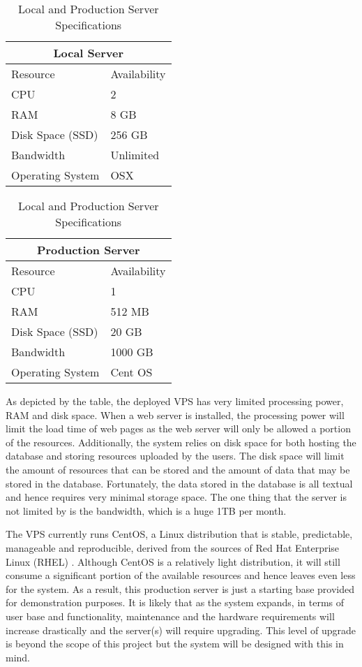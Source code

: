 \begin{table}[H]
	\centering
	\begin{tabular}{@{}ll@{}}
		\toprule
		\multicolumn{2}{c}{Local Server}       	\\ \midrule
		Resource         & Availability 			\\ \midrule
		CPU              & 2            			\\
		RAM              & 8 GB       			\\
		Disk Space (SSD) & 256 GB        		\\
		Bandwidth        & Unlimited      		\\
		Operating System & OSX     				\\ \bottomrule
	\end{tabular}
	\quad
	\begin{tabular}{@{}ll@{}}
		\toprule
		\multicolumn{2}{c}{Production Server}	\\ \midrule
		Resource         & Availability 			\\ \midrule
		CPU              & 1            			\\
		RAM              & 512 MB       			\\
		Disk Space (SSD) & 20 GB        			\\
		Bandwidth        & 1000 GB      			\\
		Operating System & Cent OS      			\\ \bottomrule
	\end{tabular}
	\caption{Local and Production Server Specifications}
	\label{table:ServerSpec}
\end{table}

As depicted by the table, the deployed VPS has very limited processing power, RAM and disk space. When a web server is installed, the processing power will limit the load time of web pages as the web server will only be allowed a portion of the resources. Additionally, the system relies on disk space for both hosting the database and storing resources uploaded by the users. The disk space will limit the amount of resources that can be stored and the amount of data that may be stored in the database. Fortunately, the data stored in the database is all textual and hence requires very minimal storage space. The one thing that the server is not limited by is the bandwidth, which is a huge 1TB per month.

The VPS currently runs CentOS, a Linux distribution that is stable, predictable, manageable and reproducible, derived from the sources of Red Hat Enterprise Linux (RHEL) \cite{CentOS:Home}. Although CentOS is a relatively light distribution, it will still consume a significant portion of the available resources and hence leaves even less for the system. As a result, this production server is just a starting base provided for demonstration purposes. It is likely that as the system expands, in terms of user base and functionality, maintenance and the hardware requirements will increase drastically and the server(s) will require upgrading. This level of upgrade is beyond the scope of this project but the system will be designed with this in mind.

